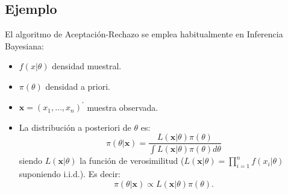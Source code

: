 \documentclass[]{book}
\newenvironment{Shaded}{\begin{snugshade}}{\end{snugshade}}
\newcommand{\KeywordTok}[1]{\textcolor[rgb]{0.13,0.29,0.53}{\textbf{#1}}}
\newcommand{\DataTypeTok}[1]{\textcolor[rgb]{0.13,0.29,0.53}{#1}}
\newcommand{\DecValTok}[1]{\textcolor[rgb]{0.00,0.00,0.81}{#1}}
\newcommand{\FloatTok}[1]{\textcolor[rgb]{0.00,0.00,0.81}{#1}}
\newcommand{\StringTok}[1]{\textcolor[rgb]{0.31,0.60,0.02}{#1}}
\newcommand{\CommentTok}[1]{\textcolor[rgb]{0.56,0.35,0.01}{\textit{#1}}}
\newcommand{\OtherTok}[1]{\textcolor[rgb]{0.56,0.35,0.01}{#1}}
\newcommand{\ControlFlowTok}[1]{\textcolor[rgb]{0.13,0.29,0.53}{\textbf{#1}}}
\newcommand{\OperatorTok}[1]{\textcolor[rgb]{0.81,0.36,0.00}{\textbf{#1}}}
\newcommand{\NormalTok}[1]{#1}
\theoremstyle{definition}
\theoremstyle{definition}
\theoremstyle{definition}
\theoremstyle{remark}
\begin{document}
\begin{Shaded}
\end{Shaded}

\subsection{Ejemplo}\label{ejemplo-1}

El algoritmo de Aceptación-Rechazo se emplea habitualmente en Inferencia
Bayesiana:

\begin{itemize}
\item
  \(f(x|\theta )\) densidad muestral.
\item
  \(\pi (\theta )\) densidad a priori.
\item
  \(\mathbf{x}=(x_{1},...,x_n)^{\prime }\) muestra observada.
\item
  La distribución a posteriori de \(\theta\) es:
  \[\pi (\theta |\mathbf{x})=\frac{L(\mathbf{x}|\theta )\pi (\theta )}
    {\int L(\mathbf{x}|\theta )\pi (\theta )d\theta }\] siendo
  \(L(\mathbf{x}|\theta )\) la función de verosimilitud
  (\(L(\mathbf{x}|\theta )=\prod\limits_{i=1}^{n}f(x_{i}|\theta)\)
  suponiendo i.i.d.). Es decir:
  \[\pi (\theta |\mathbf{x})\propto L(\mathbf{x}|\theta )\pi (\theta ).\]
\end{itemize}
\end{document}

